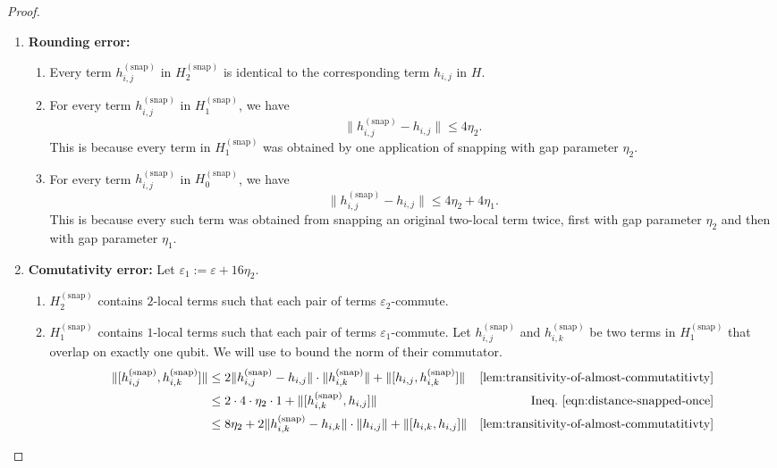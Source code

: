 \documentclass[11pt]{article}
\theoremstyle{plain}
\newcommand{\eps}{\varepsilon}
\newcommand{\snp}{{(\mathrm{snap})}}
\begin{document}
\begin{proof}
\begin{enumerate}
\begin{enumerate}
\begin{enumerate}
        \item Every term $h_{i,j}^\snp$ in $H^\snp_0$ is proportional to the identity (zero spectral gap).
    \end{enumerate}
    \item \textbf{Rounding error:}
    \begin{enumerate}
        \item Every term $h^\snp_{i,j}$ in $H^\snp_2$ is identical to the corresponding term $h_{i,j}$ in $H$.
        \item For every term $h^\snp_{i,j}$ in $H^\snp_1$, we have
        \begin{equation}\label{eqn:distance-snapped-once}
            \| h^\snp_{i,j} - h_{i,j} \| \leq 4\eta_2.
        \end{equation}
        This is because every term in $H^\snp_1$ was obtained by one application of snapping with gap parameter $\eta_2$.
        \item For every term $h^\snp_{i,j}$ in $H^\snp_0$, we have
        \[ \|h^\snp_{i,j} - h_{i,j}\| \leq 4\eta_2 + 4\eta_1. \]
        This is because every such term was obtained from snapping an original two-local term twice, first with gap parameter $\eta_2$ and then with gap parameter $\eta_1$.
    \end{enumerate}
        \item \textbf{Comutativity error:} Let $\eps_1 := \eps + 16\eta_2$.
    \begin{enumerate}
        \item $H^\snp_2$ contains $2$-local terms such that each pair of terms $\eps_2$-commute.
        \item $H^\snp_1$ contains $1$-local terms such that each pair of terms $\eps_1$-commute. Let $h^\snp_{i, j}$ and $h^\snp_{i, k}$ be two terms in $H^\snp_1$ that overlap on exactly one qubit. We will use  to bound the norm of their commutator.
\begin{align}
    \|[h^\snp_{i, j}, h^\snp_{i, k}]\| & \leq 2 \|h^\snp_{i, j} - h_{i, j}\| \cdot \|h^\snp_{i, k}\| + \|[h_{i, j}, h^\snp_{i, k}]\| & \text{\Cref{lem:transitivity-of-almost-commutatitivty}}\\
    & \leq 2 \cdot 4 \cdot  \eta_2 \cdot 1 + \|[h^\snp_{i, k}, h_{i, j}]\| & \text{Ineq.~\ref{eqn:distance-snapped-once}}\\
    & \leq 8 \eta_2  +  2 \|h^\snp_{i, k} - h_{i, k}\| \cdot \|h_{i, j}\| + \|[h_{i, k}, h_{i,j}]\|& \text{\Cref{lem:transitivity-of-almost-commutatitivty}}\\

\end{align}
\end{enumerate}
\end{enumerate}
\end{enumerate}
\end{proof}
\end{document}
